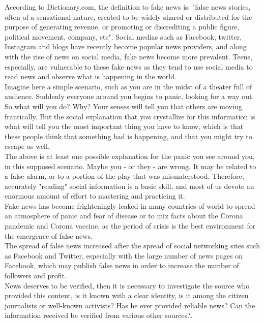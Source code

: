 \documentclass[12pt, letterpaper, twoside]{article}
\begin{document}
According to Dictionary.com, the definition to fake news is: "false news stories, often of a sensational nature, created to be widely shared or distributed for the purpose of generating revenue, or promoting or discrediting a public figure, political movement, company, etc". Social medias such as Facebook, twitter, Instagram and blogs have recently become popular news providers, and along with the rise of news on social media, fake news become more prevalent. Teens, especially, are vulnerable to these fake news as they tend to use social media to read news and observe what is happening in the world.\\ 

Imagine here a simple scenario, such as you are in the midst of a theater full of audience. Suddenly everyone around you begins to panic, looking for a way out. So what will you do? Why? Your senses will tell you that others are moving frantically. But the social explanation that you crystallize for this information is what will tell you the most important thing you have to know, which is that these people think that something bad is happening, and that you might try to escape as well.\\

The above is at least one possible explanation for the panic you see around you, in this supposed scenario. Maybe you - or they - are wrong. It may be related to a false alarm, or to a portion of the play that was misunderstood. Therefore, accurately "reading" social information is a basic skill, and most of us devote an enormous amount of effort to mastering and practicing it.\\
Fake news has become frighteningly leaked in many countries of  world to spread an atmosphere of panic and fear of disease or to mix facts about the Corona pandemic and Corona vaccine, as the period of crisis is the best environment for the emergence of false news.\\
The spread of false news increased after the spread of social networking sites such as Facebook and Twitter, especially with the large number of news pages on Facebook, which may publish false news in order to increase the number of followers and profit.\\
 News deserves to be verified, then it is necessary to investigate the source who provided this content, is it known with a clear identity, is it among the citizen journalists or well-known activists? Has he ever provided reliable news? Can the information received be verified from various other sources?.\\
\end{document}
